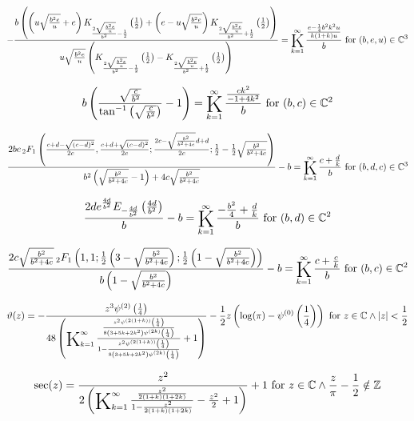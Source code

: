 \documentclass{article}
\newcommand{\bigK}{\mathop{\raisebox{-5pt}{\huge K}}}
\begin{document}
\[-\frac{b \left(\left(u \sqrt{\frac{b^2 e}{u}}+e\right) K_{\frac{2 \sqrt{\frac{b^2 e}{u}}}{b^2}-\frac{1}{2}}\left(\frac{1}{2}\right)+\left(e-u \sqrt{\frac{b^2 e}{u}}\right) K_{\frac{2 \sqrt{\frac{b^2 e}{u}}}{b^2}+\frac{1}{2}}\left(\frac{1}{2}\right)\right)}{u \sqrt{\frac{b^2 e}{u}} \left(K_{\frac{2 \sqrt{\frac{b^2 e}{u}}}{b^2}-\frac{1}{2}}\left(\frac{1}{2}\right)-K_{\frac{2 \sqrt{\frac{b^2 e}{u}}}{b^2}+\frac{1}{2}}\left(\frac{1}{2}\right)\right)}=\bigK_{k=1}^{\infty}\frac{\frac{e-\frac{1}{4} b^2 k^2 u}{k (1+k) u}}{b}\text{ for }(b,e,u)\in \mathbb{C}^3\] 

\[b \left(\frac{\sqrt{\frac{c}{b^2}}}{\tan ^{-1}\left(\sqrt{\frac{c}{b^2}}\right)}-1\right)=\bigK_{k=1}^{\infty}\frac{\frac{c k^2}{-1+4 k^2}}{b}\text{ for }(b,c)\in \mathbb{C}^2\] 

\[\frac{2 b c \, _2F_1\left(\frac{c+d-\sqrt{(c-d)^2}}{2 c},\frac{c+d+\sqrt{(c-d)^2}}{2 c};\frac{2 c-\sqrt{\frac{b^2}{b^2+4 c}} d+d}{2 c};\frac{1}{2}-\frac{1}{2} \sqrt{\frac{b^2}{b^2+4 c}}\right)}{b^2 \left(\sqrt{\frac{b^2}{b^2+4 c}}-1\right)+4 c \sqrt{\frac{b^2}{b^2+4 c}}}-b=\bigK_{k=1}^{\infty}\frac{c+\frac{d}{k}}{b}\text{ for }(b,d,c)\in \mathbb{C}^3\] 

\[\frac{2 d e^{\frac{4 d}{b^2}} E_{-\frac{4 d}{b^2}}\left(\frac{4 d}{b^2}\right)}{b}-b=\bigK_{k=1}^{\infty}\frac{-\frac{b^2}{4}+\frac{d}{k}}{b}\text{ for }(b,d)\in \mathbb{C}^2\] 

\[\frac{2 c \sqrt{\frac{b^2}{b^2+4 c}} \, _2F_1\left(1,1;\frac{1}{2} \left(3-\sqrt{\frac{b^2}{b^2+4 c}}\right);\frac{1}{2} \left(1-\sqrt{\frac{b^2}{b^2+4 c}}\right)\right)}{b \left(1-\sqrt{\frac{b^2}{b^2+4 c}}\right)}-b=\bigK_{k=1}^{\infty}\frac{c+\frac{c}{k}}{b}\text{ for }(b,c)\in \mathbb{C}^2\] 

\[\vartheta (z)=-\frac{z^3 \psi ^{(2)}\left(\frac{1}{4}\right)}{48 \left(\bigK_{k=1}^{\infty}\frac{\frac{z^2 \psi ^{(2 (1+k))}\left(\frac{1}{4}\right)}{8 \left(3+5 k+2 k^2\right) \psi ^{(2 k)}\left(\frac{1}{4}\right)}}{1-\frac{z^2 \psi ^{(2 (1+k))}\left(\frac{1}{4}\right)}{8 \left(3+5 k+2 k^2\right) \psi ^{(2 k)}\left(\frac{1}{4}\right)}}+1\right)}-\frac{1}{2} z \left(\log (\pi )-\psi ^{(0)}\left(\frac{1}{4}\right)\right)\text{ for }z\in \mathbb{C}\land \left| z\right| <\frac{1}{2}\] 

\[\sec (z)=\frac{z^2}{2 \left(\bigK_{k=1}^{\infty}\frac{\frac{z^2}{2 (1+k) (1+2 k)}}{1-\frac{z^2}{2 (1+k) (1+2 k)}}-\frac{z^2}{2}+1\right)}+1\text{ for }z\in \mathbb{C}\land \frac{z}{\pi }-\frac{1}{2}\notin \mathbb{Z}\] 
\end{document}
